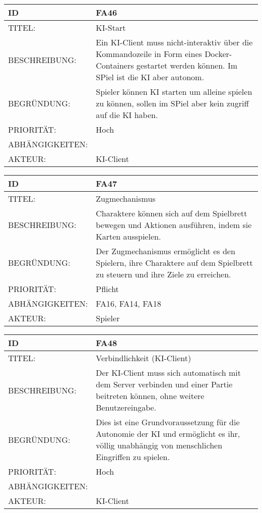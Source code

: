 \documentclass{uulm-assignment}
\begin{document}
     \begin{tabularx}{\textwidth}{|l|X |} \hline
        \textbf{ID} & \textbf{FA46} \\
        \hline
        TITEL: &  KI-Start\\
        \hline
        BESCHREIBUNG: &  Ein KI-Client muss nicht-interaktiv über die Kommandozeile in Form eines Docker-Containers gestartet werden können. Im SPiel ist die KI aber autonom.\\
        \hline
        BEGRÜNDUNG: &  Spieler können KI starten um alleine spielen zu können, sollen im SPiel aber kein zugriff auf die KI haben.\\
        \hline
        PRIORITÄT: & Hoch\\
        \hline
        ABHÄNGIGKEITEN: & \\
        \hline
        AKTEUR: & KI-Client\\
        \hline
    \end{tabularx}
    
    \begin{tabularx}{\textwidth}{|l|X |} \hline
        \textbf{ID} & \textbf{FA47} \\
        \hline
        TITEL: & Zugmechanismus\\
        \hline
        BESCHREIBUNG: & Charaktere können sich auf dem Spielbrett bewegen und Aktionen ausführen, indem sie Karten ausspielen.
        \\
        \hline
        BEGRÜNDUNG: & Der Zugmechanismus ermöglicht es den Spielern, ihre Charaktere auf dem Spielbrett zu steuern und ihre Ziele zu erreichen.\\
        \hline
        PRIORITÄT: & Pflicht \\
        \hline
        ABHÄNGIGKEITEN: & FA16, FA14, FA18 \\
        \hline
        AKTEUR: & Spieler\\
        \hline
    \end{tabularx}
    
    \begin{tabularx}{\textwidth}{|l|X |} \hline
        \textbf{ID} & \textbf{FA48} \\
        \hline
        TITEL: & Verbindlichkeit (KI-Client) \\
        \hline
        BESCHREIBUNG: & Der KI-Client muss sich automatisch mit dem Server verbinden und einer Partie beitreten können, ohne weitere Benutzereingabe.
        \\
        \hline
        BEGRÜNDUNG: & Dies ist eine Grundvoraussetzung für die Autonomie der KI und ermöglicht es ihr, völlig unabhängig von menschlichen Eingriffen zu spielen.\\
        \hline
        PRIORITÄT: & Hoch \\
        \hline
        ABHÄNGIGKEITEN: &  \\
        \hline
        AKTEUR: & KI-Client\\
        \hline
    \end{tabularx}
    
\end{document}
